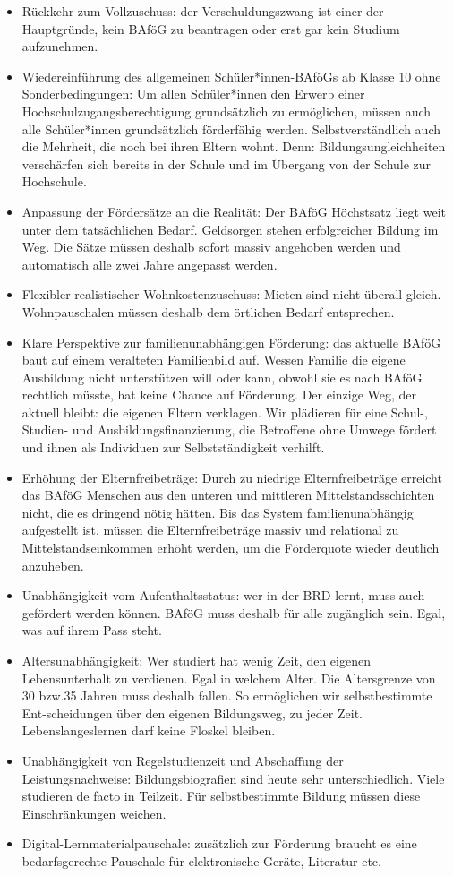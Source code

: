 \documentclass[DIV=calc]{scrartcl}
\begin{document}
\begin{itemize}
    \item Rückkehr zum Vollzuschuss: der Verschuldungszwang ist einer der Hauptgründe, kein BAföG zu beantragen oder erst gar kein Studium aufzunehmen.
    \item Wiedereinführung des allgemeinen Schüler*innen-BAföGs ab Klasse 10 ohne Sonderbedingungen: Um allen Schüler*innen den Erwerb einer Hochschulzugangsberechtigung grundsätzlich zu ermöglichen, müssen auch alle Schüler*innen grundsätzlich förderfähig werden. Selbstverständlich auch die Mehrheit, die noch bei ihren Eltern wohnt. Denn: Bildungsungleichheiten verschärfen sich bereits in der Schule und im Übergang von der Schule zur Hochschule.
    \item Anpassung der Fördersätze an die Realität: Der BAföG Höchstsatz liegt weit unter dem tatsächlichen Bedarf. Geldsorgen stehen erfolgreicher Bildung im Weg. Die Sätze müssen deshalb sofort massiv angehoben werden und automatisch alle zwei Jahre angepasst werden.
    \item Flexibler  realistischer Wohnkostenzuschuss: Mieten sind nicht überall gleich. Wohnpauschalen müssen deshalb dem örtlichen Bedarf entsprechen.
    \item Klare Perspektive zur familienunabhängigen Förderung: das aktuelle BAföG baut auf einem veralteten Familienbild auf. Wessen Familie die eigene Ausbildung nicht unterstützen will oder kann, obwohl sie es nach BAföG rechtlich müsste, hat keine Chance auf Förderung. Der einzige Weg, der aktuell bleibt: die eigenen Eltern verklagen. Wir plädieren für eine Schul-, Studien- und Ausbildungsfinanzierung, die Betroffene ohne Umwege fördert und ihnen als Individuen zur Selbstständigkeit verhilft.
    \item Erhöhung der Elternfreibeträge: Durch zu niedrige Elternfreibeträge erreicht das BAföG Menschen aus den unteren und mittleren Mittelstandsschichten nicht, die es dringend nötig hätten. Bis das System familienunabhängig aufgestellt ist, müssen die Elternfreibeträge massiv und relational zu Mittelstandseinkommen erhöht werden, um die Förderquote wieder deutlich anzuheben.
    \item Unabhängigkeit vom Aufenthaltsstatus: wer in der BRD lernt, muss auch gefördert werden können. BAföG muss deshalb für alle zugänglich sein. Egal, was auf ihrem Pass steht.
    \item Altersunabhängigkeit: Wer studiert hat wenig Zeit, den eigenen Lebensunterhalt zu verdienen. Egal in welchem Alter. Die Altersgrenze von 30 bzw.35 Jahren muss deshalb fallen. So ermöglichen wir selbstbestimmte Ent-scheidungen über den eigenen Bildungsweg, zu jeder Zeit. Lebenslangeslernen darf keine Floskel bleiben.
    \item Unabhängigkeit von Regelstudienzeit und Abschaffung der Leistungsnachweise: Bildungsbiografien sind heute sehr unterschiedlich. Viele studieren de facto in Teilzeit. Für selbstbestimmte Bildung müssen diese Einschränkungen weichen.
    \item Digital-Lernmaterialpauschale: zusätzlich zur Förderung braucht es eine bedarfsgerechte Pauschale für elektronische Geräte, Literatur etc.
\end{itemize}
\end{document}
